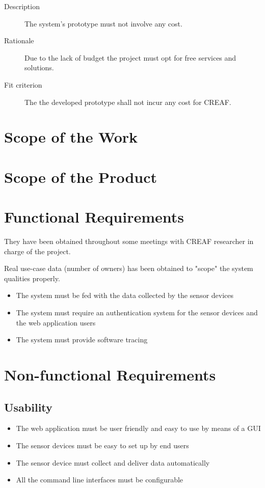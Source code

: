 \begin{description}
\item[Description] The system's prototype must not involve any cost.
\item[Rationale] Due to the lack of budget the project must opt for free services and solutions.
\item[Fit criterion] The the developed prototype shall not incur any cost for CREAF.
\end{description}

\section{Scope of the Work}
\section{Scope of the Product}

\section{Functional Requirements}

They have been obtained throughout some meetings with CREAF researcher in charge of the project.

Real use-case data (number of owners) has been obtained to "scope" the system qualities properly.

\begin{itemize}
	\item The system must be fed with the data collected by the sensor devices
	\item The system must require an authentication system for the sensor devices and the web application users
	\item The system must provide software tracing
\end{itemize}

\section{Non-functional Requirements}

\subsection*{Usability}

\begin{itemize}
	\item The web application must be user friendly and easy to use by means of a GUI
	\item The sensor devices must be easy to set up by end users
	\item The sensor device must collect and deliver data automatically
	\item All the command line interfaces must be configurable
\end{itemize}


